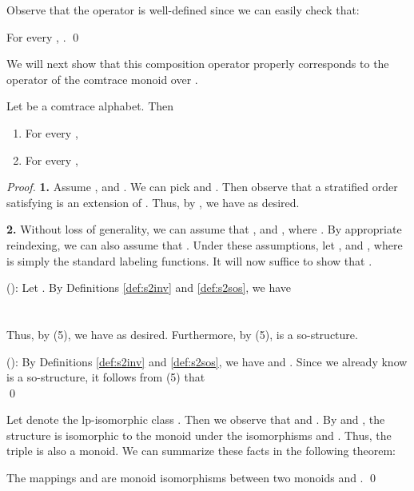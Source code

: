 \documentclass{llncs}
\begin{document}
Observe that the operator is well-defined since  we can easily check that:
\begin{proposition}
For every , . \qed 
\end{proposition}

We will next show that this composition operator  properly corresponds to the operator   of the comtrace monoid over .

\begin{proposition}  Let  be a comtrace alphabet. Then  
\begin{enumerate}
\item For every , 

\item For every ,

\end{enumerate}
\label{prop:hom1}
\end{proposition}
\begin{proof}\textbf{1. }Assume ,  and . We can pick  and . Then observe that a stratified order  satisfying  is an extension of . Thus, by , we have 
 as desired.

\textbf{2. } Without loss of generality, we can assume that ,  and , where . By appropriate reindexing, we can also assume that . Under these assumptions, let ,  and , where  is simply the standard labeling functions. It will now suffice to show that .


(): Let . By Definitions \ref{def:s2inv} and \ref{def:s2sos}, we have\\
\mbox{\hspace{1.5cm}}\\
\mbox{\hspace{1.5cm}}\\
Thus, by  (5),  we have  as desired. Furthermore, by   (5),   is a so-structure.


(): By Definitions \ref{def:s2inv} and \ref{def:s2sos}, we have  and . Since we already know  is a so-structure, it follows from  (5) that \\
\mbox{\hspace{1.3cm}}\qed
\end{proof}

Let  denote the lp-isomorphic class  . Then we observe that  and . By  and , the structure  is isomorphic to the monoid  under the isomorphisms  and . Thus, the triple  is also a monoid. We can summarize these facts in the following theorem:
\begin{theorem}
The mappings  and  are monoid isomorphisms between two monoids  and  . \qed
\end{theorem}
\end{document}
